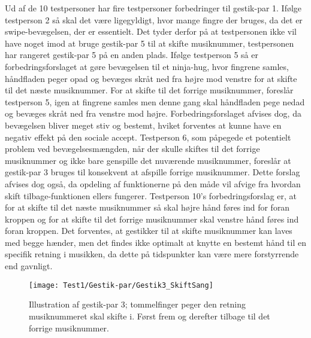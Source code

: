 Ud af de 10 testpersoner har fire testpersoner forbedringer til gestik-par 1. Ifølge testperson 2 så skal det være ligegyldigt, hvor mange fingre der bruges, da det er swipe-bevægelsen, der er essentielt. Det tyder derfor på at testpersonen ikke vil have noget imod at bruge gestik-par 5 til at skifte musiknummer, testpersonen har rangeret gestik-par 5 på en anden plads. Ifølge testperson 5 så er forbedringsforslaget at gøre bevægelsen til et ninja-hug, hvor fingrene samles, håndfladen peger opad og bevæges skråt ned fra højre mod venstre for at skifte til det næste musiknummer. For at skifte til det forrige musiknummer, foreslår testperson 5, igen at fingrene samles men denne gang skal håndfladen pege nedad og bevæges skråt ned fra venstre mod højre. Forbedringsforslaget afvises dog, da bevægelsen bliver meget stiv og bestemt, hviket forventes at kunne have en negativ effekt på den sociale accept. Testperson 6, som påpegede et potentielt problem ved bevægelsesmængden, når der skulle skiftes til det forrige musiknummer og ikke bare genspille det nuværende musiknummer, foreslår at gestik-par 3 bruges til konsekvent at afspille forrige musiknummer. Dette forslag afvises dog også, da opdeling af funktionerne på den måde vil afvige fra hvordan skift tilbage-funktionen ellers fungerer. Testperson 10's forbedringsforslag er, at for at skifte til det næste musiknummer så skal højre hånd føres ind for foran kroppen og for at skifte til det forrige musiknummer skal venstre hånd føres ind foran kroppen. Det forventes, at gestikker til at skifte musiknummer kan laves med begge hænder, men det findes ikke optimalt at knytte en bestemt hånd til en specifik retning i musikken, da dette på tidspunkter kan være mere forstyrrende end gavnligt. 
%
\begin{figure}[H]
	\centering
	\texttt{[image: Test1/Gestik-par/Gestik3\_SkiftSang]}
	\caption{Illustration af gestik-par 3; tommelfinger peger den retning musiknummeret skal skifte i. Først frem og derefter tilbage til det forrige musiknummer.}
	\label{fig:GestikPar3Skift}
\end{figure}
\noindent
% 
